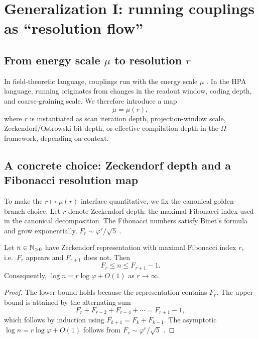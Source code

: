 \section{Generalization I: running couplings as ``resolution flow''}
\label{sec:running_couplings}

\subsection{From energy scale \texorpdfstring{$\mu$}{mu} to resolution \texorpdfstring{$r$}{r}}
In field-theoretic language, couplings run with the energy scale $\mu$ \cite{GellMannLow1954,PeskinSchroeder1995}. In the HPA language, running originates from changes in the readout window, coding depth, and coarse-graining scale. We therefore introduce a map
\begin{equation}
\mu=\mu(r),
\end{equation}
where $r$ is instantiated as scan iteration depth, projection-window scale, Zeckendorf/\allowbreak Ostrowski bit depth, or effective compilation depth in the $\Omega$ framework, depending on context.

\subsection{A concrete choice: Zeckendorf depth and a Fibonacci resolution map}
To make the $r\mapsto\mu(r)$ interface quantitative, we fix the canonical golden-branch choice. Let $r$ denote Zeckendorf depth: the maximal Fibonacci index used in the canonical decomposition. The Fibonacci numbers satisfy Binet's formula and grow exponentially, $F_r\sim \varphi^r/\sqrt{5}$ \cite{Koshy2001}.

\begin{lemma}\label{lem:zeckendorf_depth_growth}
Let $n\in\mathbb{N}_{>0}$ have Zeckendorf representation with maximal Fibonacci index $r$, i.e.\ $F_r$ appears and $F_{r+1}$ does not. Then
\begin{equation}
F_r\le n\le F_{r+1}-1.
\end{equation}
Consequently, $\log n = r\log\varphi+O(1)$ as $r\to\infty$.
\end{lemma}
\begin{proof}
The lower bound holds because the representation contains $F_r$. The upper bound is attained by the alternating sum
\begin{equation}
F_r+F_{r-2}+F_{r-4}+\cdots = F_{r+1}-1,
\end{equation}
which follows by induction using $F_{k+1}=F_k+F_{k-1}$. The asymptotic $\log n=r\log\varphi+O(1)$ follows from $F_r\sim \varphi^r/\sqrt{5}$ \cite{Koshy2001}.
\end{proof}

